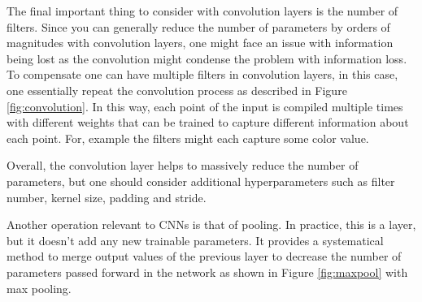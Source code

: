 \documentclass[11pt,a4paper]{article} %
\numberwithin{equation}{section}
\begin{document}
    	The final important thing to consider with convolution layers is the number of filters. Since you can generally reduce the number of parameters by orders of magnitudes with convolution layers, one might face an issue with information being lost as the convolution might condense the problem with information loss. To compensate one can have multiple filters in convolution layers, in this case, one essentially repeat the convolution process as described in Figure \ref{fig:convolution}. In this way, each point of the input is compiled multiple times with different weights that can be trained to capture different information about each point. For, example the filters might each capture some color value.
    	
    	Overall, the convolution layer helps to massively reduce the number of parameters, but one should consider additional hyperparameters such as filter number, kernel size, padding and stride.
    	
    	Another operation relevant to CNNs is that of pooling. In practice, this is a layer, but it doesn't add any new trainable parameters. It provides a systematical method to merge output values of the previous layer to decrease the number of parameters passed forward in the network as shown in Figure \ref{fig:maxpool} with max pooling.
    	
\end{document}
